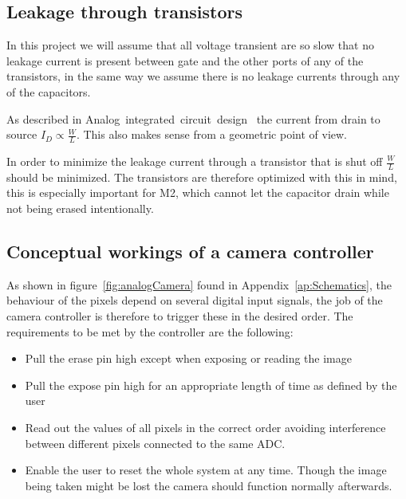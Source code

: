 \subsection{Leakage through transistors}\label{sec:leakagecurrent}

In this project we will assume that all voltage transient are so slow that no leakage current is present between gate and the other ports of any of the transistors,
in the same way we assume there is no leakage currents through any of the capacitors.

As described in Analog~integrated~circuit~design~\cite{AnalogBook} the current from drain to source $I_D \propto \frac{W}{L}$.
This also makes sense from a geometric point of view.

In order to minimize the leakage current through a transistor that is shut off $\frac{W}{L}$ should be minimized. The transistors are therefore optimized with this in mind, this is especially important for M2, which cannot let the capacitor drain while not being erased intentionally.


\subsection{Conceptual workings of a camera controller}

As shown in figure~\ref{fig:analogCamera} found in Appendix~\ref{ap:Schematics}, the behaviour of the pixels depend on several digital input signals,
the job of the camera controller is therefore to trigger these in the desired order.
The requirements to be met by the controller are the following:

\begin{itemize}
\item Pull the erase pin high except when exposing or reading the image
\item Pull the expose pin high for an appropriate length of time as defined by the user
\item Read out the values of all pixels in the correct order avoiding interference between different pixels connected to the same ADC.
\item Enable the user to reset the whole system at any time. Though the image being taken might be lost the camera should function normally afterwards.
\end{itemize}

